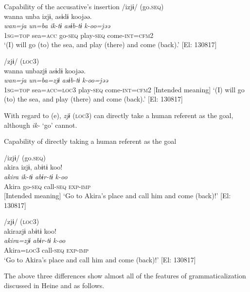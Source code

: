 \ea\label{ex:6-87}
  Capability of the accusative’s insertion
 \ea /izjɨ/ (go.\textsc{seq})\\
{\TM}
\glll  wanna  unba  izjɨ,  asɨdɨ  koojəə.\\
\textit{wan=ja}  \textit{un=ba}  \textit{ik-tɨ}  \textit{asɨb-tɨ}  \textit{k-oo=jəə}\\
1\textsc{sg}=\textsc{top}  sea=\textsc{acc}  go-\textsc{seq}  play-\textsc{seq}  come-\textsc{int}=\textsc{cfm}2\\
\glt ‘(I) will go (to) the sea, and play (there) and come (back).’ [El: 130817]

\ex /zjɨ/ (\textsc{loc3})\\
{\TM}
\glll  *wanna  unbazjɨ  asɨdɨ  koojəə.\\
\textit{wan=ja}  \textit{un=ba=zjɨ}  \textit{asɨb-tɨ}  \textit{k-oo=jəə}\\
1\textsc{sg}=\textsc{top}  sea=\textsc{acc}=\textsc{loc3}  play-\textsc{seq}  come-\textsc{int}=\textsc{cfm}2
{}      [Intended meaning] ‘(I) will go (to) the sea, and play (there) and come (back).’ [El: 130817]
\z
\z

With regard to (e), \textit{zjɨ} (\textsc{loc3}) can directly take a human referent as the goal, although \textit{ik-} ‘go’ cannot.

\ea\label{ex:6-88}
  Capability of directly taking a human referent as the goal

 \ea /izjɨ/ (go.\textsc{seq})\\
{\TM}
\glll  *akira  izjɨ,  abɨtɨ  koo!\\
\textit{akira}  \textit{ik-tɨ}  \textit{abɨr-tɨ}  \textit{k-oo}\\
Akira  go-\textsc{seq}  call-\textsc{seq}  \textsc{exp}-\textsc{imp}\\
{}       [Intended meaning] ‘Go to Akira’s place and call him and come (back)!’ [El: 130817]

\ex /zjɨ/ (\textsc{loc3})\\
{\TM}
\glll  akirazjɨ  abɨtɨ  koo!\\
\textit{akira=zjɨ}  \textit{abɨr-tɨ}  \textit{k-oo}\\
Akira=\textsc{loc3}  call-\textsc{seq}  \textsc{exp}-\textsc{imp}\\
 \glt ‘Go to Akira’s place and call him and come (back)!’ [El: 130817]
\z
\z

The above three differences show almost all of the features of grammaticalization discussed in Heine and \citet[2]{Kuteva2002} as follows.

